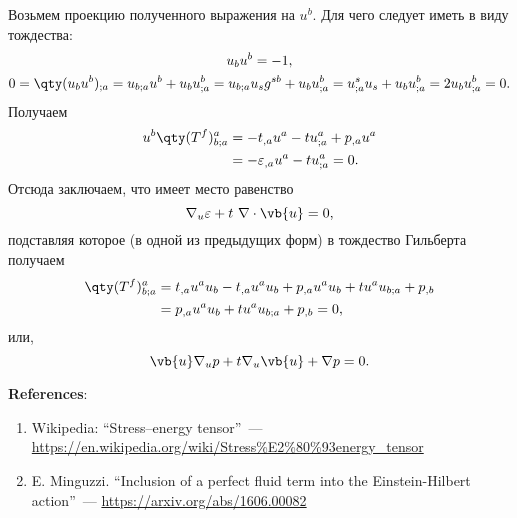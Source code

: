 \documentclass[\docroot/reports/draft/report.tex]{subfiles}
\begin{document}
    Возьмем проекцию полученного выражения на $u^b$. Для чего следует иметь в виду тождества:
    \begin{gather*}
        u_b u^b = -1 , \\
        0 = \qty(u_b u^b)_{;a} = u_{b;a} u^b + u_b u^b_{;a}
          = u_{b;a} u_s g^{sb} + u_b u^b_{;a}
          = u^s_{;a} u_s + u_b u^b_{;a}
          = 2 u_b u^b_{;a}
          = 0 .
    \end{gather*}
    Получаем
    \begin{equation*}\begin{aligned}
        u^b \qty(T^f)^a_{b;a} &= - t_{,a} u^a - t u^a_{;a} + p_{,a} u^a \\
                              &= - \varepsilon_{,a} u^a - t u^a_{;a} = 0 .
    \end{aligned}\end{equation*}
    Отсюда заключаем, что имеет место равенство
    \begin{equation}
        \nabla_u \varepsilon + t\ \nabla \cdot \vb{u} = 0 ,
    \end{equation}
    подставляя которое (в одной из предыдущих форм) в тождество Гильберта получаем
    \begin{equation*}\begin{aligned}
        \qty(T^f)^a_{b;a} &= t_{,a} u^a u_b - t_{,a} u^a u_b + p_{,a} u^a u_b + t u^a u_{b;a} + p_{,b} \\
                          &= p_{,a} u^a u_b + t u^a u_{b;a} + p_{,b} = 0 ,
    \end{aligned}\end{equation*}
    или,
    \begin{equation}
        \vb{u} \nabla_u p + t \nabla_u \vb{u} + \nabla p = 0 .
    \end{equation}

    \vspace{1cm}

    \textbf{\Large{References}}:
    \begin{enumerate}
        \item Wikipedia: \enquote{Stress–energy tensor}~--- \url{https://en.wikipedia.org/wiki/Stress%E2%80%93energy_tensor}
        \item E. Minguzzi. \enquote{Inclusion of a perfect fluid term into the Einstein-Hilbert action}~--- \url{https://arxiv.org/abs/1606.00082}
    \end{enumerate}
\end{document}
